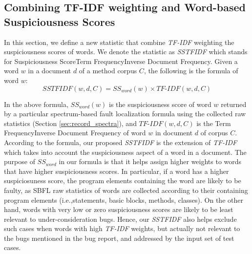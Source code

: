 \subsection{Combining TF-IDF weighting and Word-based Suspiciousness Scores}\label{sec:sstfidf}

In this section, we define a new statistic that combine \textit{TF-IDF} weighting the suspiciousness scores of words. We denote the statistic as \textit{SSTFIDF} which stands for Suspiciousness Score\textendash Term Frequency\textendash Inverse Document Frequency. Given a word $w$ in a document $d$ of a method corpus $C$, the following is the formula of word $w$:
\begin{equation}
SSTFIDF(w,d,C)=SS_{word}(w)\times \textit{TF-IDF}(w,d,C)
\label{eq:sstfidf}
\end{equation}


In the above formula, $SS_{word}(w)$ is the suspiciousness score of word $w$ returned by a particular spectrum-based fault localization formula using the collected raw statistics (Section \ref{sec:record_spectra}), and $\textit{TF-IDF}(w,d,C)$ is the Term Frequency\textendash Inverse Document Frequency of word $w$ in document $d$ of corpus $C$. According to the formula, our proposed \textit{SSTFIDF} is the extension of \textit{TF-IDF} which takes into account the suspiciousness aspect of a word in a document. The purpose of $SS_{word}$ in our formula is that it helps assign higher weights to words that have higher suspiciousness scores. In particular, if a word has a higher suspiciosuness score, the program elements containing the word are likely to be faulty, as SBFL raw statistics of words are collected according to their containing program elements (i.e.,statements, basic blocks, methods, classes). On the other hand, words with very low or zero suspiciousness scores are likely to be least relevant to under-consideration bugs. Hence, our \textit{SSTFIDF} also helps exclude such cases when words with high \textit{TF-IDF} weights, but actually not relevant to the bugs mentioned in the bug report, and addressed by the input set of test cases.



